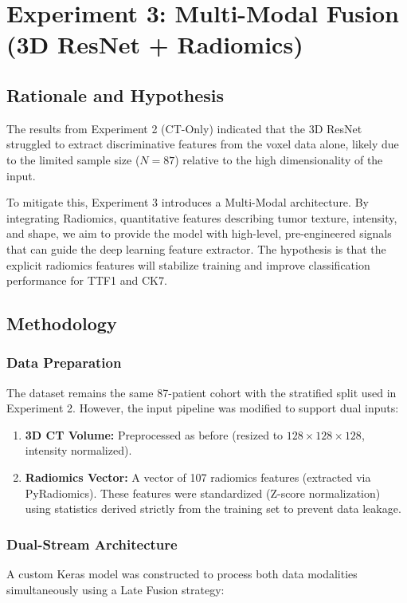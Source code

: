 \usepackage{float}      
\usepackage{subcaption}
\section{Experiment 3: Multi-Modal Fusion (3D ResNet + Radiomics)}

\subsection{Rationale and Hypothesis}
The results from Experiment 2 (CT-Only) indicated that the 3D ResNet struggled to extract discriminative features from the voxel data alone, likely due to the limited sample size ($N=87$) relative to the high dimensionality of the input. 

To mitigate this, Experiment 3 introduces a Multi-Modal architecture. By integrating Radiomics, quantitative features describing tumor texture, intensity, and shape, we aim to provide the model with high-level, pre-engineered signals that can guide the deep learning feature extractor. The hypothesis is that the explicit radiomics features will stabilize training and improve classification performance for TTF1 and CK7.

\subsection{Methodology}

\subsubsection{Data Preparation}
The dataset remains the same 87-patient cohort with the stratified split used in Experiment 2. However, the input pipeline was modified to support dual inputs:
\begin{enumerate}
    \item \textbf{3D CT Volume:} Preprocessed as before (resized to $128\times128\times128$, intensity normalized).
    \item \textbf{Radiomics Vector:} A vector of 107 radiomics features (extracted via PyRadiomics). These features were standardized (Z-score normalization) using statistics derived strictly from the training set to prevent data leakage.
\end{enumerate}

\subsubsection{Dual-Stream Architecture}
A custom Keras model was constructed to process both data modalities simultaneously using a Late Fusion strategy:

